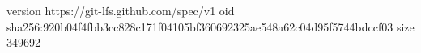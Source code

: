 version https://git-lfs.github.com/spec/v1
oid sha256:920b04f4fbb3cc828c171f04105bf360692325ae548a62c04d95f5744bdccf03
size 349692
